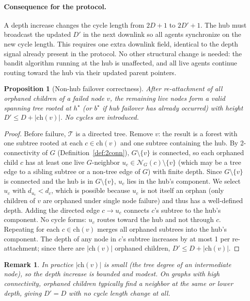 \documentclass{article}
\newtheorem{proposition}{Proposition}
\newtheorem{remark}{Remark}
\begin{document}
\paragraph{Consequence for the protocol.} A depth increase changes the cycle length from
$2D + 1$ to $2D' + 1$. The hub must broadcast the updated $D'$ in the next downlink so
all agents synchronize on the new cycle length. This requires one extra downlink field,
identical to the depth signal already present in the protocol. No other structural change
is needed: the bandit algorithm running at the hub is unaffected, and all live agents
continue routing toward the hub via their updated parent pointers.

\begin{proposition}[Non-hub failover correctness]
\label{prop:nonhub}
    After re-attachment of all orphaned children of a failed node $v$, the remaining live
    nodes form a valid spanning tree rooted at $h^\star$ (or $b^\star$ if hub failover
    has already occurred) with height $D' \leq D + |\mathrm{ch}(v)|$. No cycles are
    introduced.
\end{proposition}

\begin{proof}
    Before failure, $\mathcal{T}$ is a directed tree. Remove $v$: the result is a forest
    with one subtree rooted at each $c \in \mathrm{ch}(v)$ and one subtree containing the
    hub. By 2-connectivity of $G$ (Definition~\ref{def:2conn}), $G \setminus \{v\}$ is
    connected, so each orphaned child $c$ has at least one live $G$-neighbor $u_c \in
    \mathcal{N}_G(c) \setminus \{v\}$ (which may be a tree edge to a sibling subtree or
    a non-tree edge of $G$) with finite depth. Since $G \setminus \{v\}$ is connected and
    the hub is in $G \setminus \{v\}$, $u_c$ lies in the hub's component. We select $u_c$
    with $d_{u_c} < d_c$, which is possible because $u_c$ is not itself an orphan (only
    children of $v$ are orphaned under single node failure) and thus has a well-defined
    depth. Adding the directed edge $c \to u_c$ connects $c$'s subtree to the hub's
    component. No cycle forms: $u_c$ routes toward the hub and not through $c$. Repeating
    for each $c \in \mathrm{ch}(v)$ merges all orphaned subtrees into the hub's component.
    The depth of any node in $c$'s
    subtree increases by at most 1 per re-attachment; since there are $|\mathrm{ch}(v)|$
    orphaned children, $D' \leq D + |\mathrm{ch}(v)|$.
\end{proof}

\begin{remark}
    In practice $|\mathrm{ch}(v)|$ is small (the tree degree of an intermediate node),
    so the depth increase is bounded and modest. On graphs with high connectivity,
    orphaned children typically find a neighbor at the same or lower depth, giving
    $D' = D$ with no cycle length change at all.
\end{remark}
\end{document}

